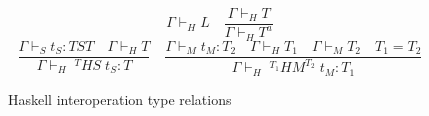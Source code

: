 \begin{figure}
\[
\Gamma\vdash_{H}L
\quad
\frac{\Gamma\vdash_{H}T}{\Gamma\vdash_{H}T^{a}}
\]
\[
\frac{\Gamma\vdash_{S}t_{S}:TST\quad\Gamma\vdash_{H}T}{\Gamma\vdash_{H}\;^{T}HS\;t_{S}:T}
\quad
\frac{\Gamma\vdash_{M}t_{M}:T_{2}\quad\Gamma\vdash_{H}T_{1}\quad\Gamma\vdash_{M}T_{2}\quad T_{1}=T_{2}}{\Gamma\vdash_{H}\;^{T_{1}}HM^{T_{2}}\;t_{M}:T_{1}}
\]
\caption{Haskell interoperation type relations}
\label{hitr}
\end{figure}